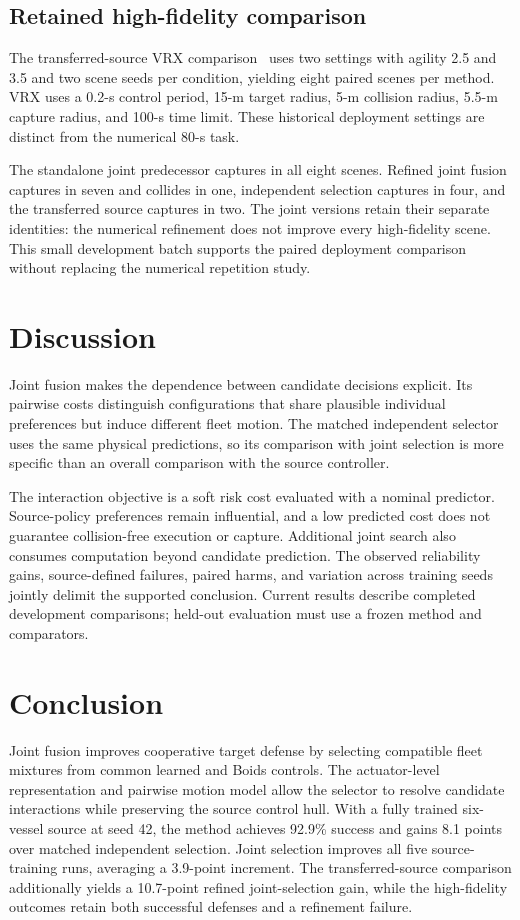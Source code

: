 \documentclass[journal]{IEEEtran}
\begin{document}
\subsection{Retained high-fidelity comparison}
The transferred-source VRX comparison~\cite{vrx} uses two settings with agility 2.5 and 3.5 and two scene seeds per condition, yielding eight paired scenes per method. VRX uses a 0.2-s control period, 15-m target radius, 5-m collision radius, 5.5-m capture radius, and 100-s time limit. These historical deployment settings are distinct from the numerical 80-s task.

The standalone joint predecessor captures in all eight scenes. Refined joint fusion captures in seven and collides in one, independent selection captures in four, and the transferred source captures in two. The joint versions retain their separate identities: the numerical refinement does not improve every high-fidelity scene. This small development batch supports the paired deployment comparison without replacing the numerical repetition study.

\section{Discussion}
Joint fusion makes the dependence between candidate decisions explicit. Its pairwise costs distinguish configurations that share plausible individual preferences but induce different fleet motion. The matched independent selector uses the same physical predictions, so its comparison with joint selection is more specific than an overall comparison with the source controller.

The interaction objective is a soft risk cost evaluated with a nominal predictor. Source-policy preferences remain influential, and a low predicted cost does not guarantee collision-free execution or capture. Additional joint search also consumes computation beyond candidate prediction. The observed reliability gains, source-defined failures, paired harms, and variation across training seeds jointly delimit the supported conclusion. Current results describe completed development comparisons; held-out evaluation must use a frozen method and comparators.

\section{Conclusion}
Joint fusion improves cooperative target defense by selecting compatible fleet mixtures from common learned and Boids controls. The actuator-level representation and pairwise motion model allow the selector to resolve candidate interactions while preserving the source control hull. With a fully trained six-vessel source at seed 42, the method achieves 92.9\% success and gains 8.1 points over matched independent selection. Joint selection improves all five source-training runs, averaging a 3.9-point increment. The transferred-source comparison additionally yields a 10.7-point refined joint-selection gain, while the high-fidelity outcomes retain both successful defenses and a refinement failure.
\end{document}
